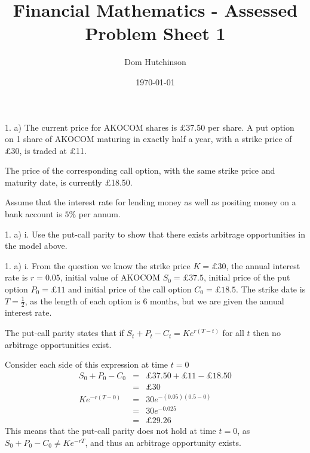 \documentclass[11pt,a4paper]{article}
\begin{document}

\title{Financial Mathematics - Assessed Problem Sheet 1}
\author{Dom Hutchinson}
\date{\today}
\maketitle

\begin{question}{1. a)}
  The current price for AKOCOM shares is £37.50 per share. A put option on 1 share of AKOCOM maturing in exactly half a year, with a strike price of £30, is traded at £11.
  \par The price of the corresponding call option, with the same strike price and maturity date, is currently £18.50.
  \par Assume that the interest rate for lending money as well as positing money on a bank account is $5\%$ per annum.
\end{question}

\begin{question}{1. a) i.}
  Use the put-call parity to show that there exists arbitrage opportunities in the model above.
\end{question}

\begin{answer}{1. a) i.}
  From the question we know the strike price $K=\pounds30$, the annual interest rate is $r=0.05$, initial value of AKOCOM $S_0=\pounds37.5$, initial price of the put option $P_0=\pounds11$ and initial price of the call option $C_0=\pounds18.5$. The strike date is $T=\frac12$, as the length of each option is 6 months, but we are given the annual interest rate.
  \par The put-call parity states that if $S_t+P_t-C_t=Ke^{r(T-t)}$ for all $t$ then no arbitrage opportunities exist.
  \par Consider each side of this expression at time $t=0$
  \[\begin{array}{rcl}
    S_0+P_0-C_0&=&\pounds37.50+\pounds11-\pounds18.50\\
    &=&\pounds30\\
    Ke^{-r(T-0)}&=&30e^{-(0.05)(0.5-0)}\\
    &=&30e^{-0.025}\\
    &=&\pounds29.26
  \end{array}\]
  This means that the put-call parity does not hold at time $t=0$, as $S_0+P_0-C_0\neq Ke^{-rT}$, and thus an arbitrage opportunity exists.
\end{answer}
\end{document}
